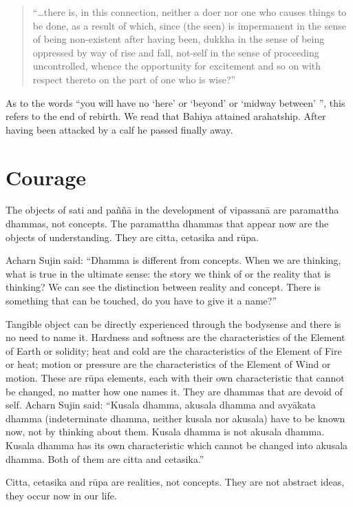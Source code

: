 \begin{quote}

``\ldots there is, in this connection, neither a doer nor one who causes things to be done, as a result of which, since (the seen) is impermanent in the sense of being non-existent after having been, dukkha in the sense of being oppressed by way of rise and fall, not-self in the sense of proceeding uncontrolled, whence the opportunity for excitement and so on with respect thereto on the part of one who is wise?''

\end{quote}

As to the words ``you will have no ‘here’ or ‘beyond’ or ‘midway between’ '', this refers to the end of rebirth. We read that Bahiya attained arahatship. After having been attacked by a calf he passed finally away.

\chapter{Courage}

The objects of sati and paññā in the development of vipassanā are paramattha dhammas, not concepts. The paramattha dhammas that appear now are the objects of understanding. They are citta, cetasika and rūpa.

Acharn Sujin said: ``Dhamma is different from concepts. When we are thinking, what is true in the ultimate sense: the story we think of or the reality that is thinking? We can see the distinction between reality and concept. There is something that can be touched, do you have to give it a name?''

Tangible object can be directly experienced through the bodysense and there is no need to name it. Hardness and softness are the characteristics of the Element of Earth or solidity; heat and cold are the characteristics of the Element of Fire or heat; motion or pressure are the characteristics of the Element of Wind or motion. These are rūpa elements, each with their own characteristic that cannot be changed, no matter how one names it. They are dhammas that are devoid of self.
Acharn Sujin said: ``Kusala dhamma, akusala dhamma and avyākata dhamma (indeterminate dhamma, neither kusala nor akusala) have to be known now, not by thinking about them. Kusala dhamma is not akusala dhamma. Kusala dhamma has its own characteristic which cannot be changed into akusala dhamma. Both of them are citta and cetasika.''

Citta, cetasika and rūpa are realities, not concepts. They are not abstract ideas, they occur now in our life.

